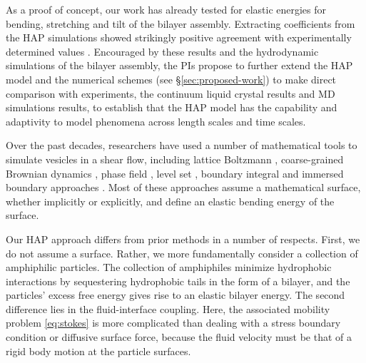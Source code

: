 As a proof of concept, our work has already tested for elastic energies for bending, stretching and tilt of the bilayer assembly.
Extracting coefficients from the HAP simulations showed strikingly
positive agreement with experimentally determined values
\cite{Fu2018_SIAM}.
Encouraged by these results and the hydrodynamic simulations of the bilayer assembly, the PIs propose to
further extend the HAP model and the numerical schemes (see \S\ref{sec:proposed-work})
to make direct comparison with experiments, the continuum liquid crystal results and MD simulations results, to establish that
the HAP model has the capability and adaptivity to model phenomena across length scales and time scales.

Over the past decades, researchers have used a number of mathematical tools 
to simulate vesicles in a shear flow, including  lattice Boltzmann \cite{KaouiHartingMisbah2011_PRE}, coarse-grained Brownian dynamics \cite{NoguchiTakasu2002_BJ},
phase field \cite{DuLiuWang2004_JCP,BibenKassnerMisbah2005_PRE}, 
level set \cite{DoyeuxGuyotChabannesEtAl2013_JCAM}, boundary integral \cite{Shravan09,Rahimian15} and 
immersed boundary approaches \cite{KimLai2010_JCP,KimLai2012_PRE,HuLaiSeolEtAl2016_JCP}. Most of these approaches
assume a mathematical surface, whether implicitly or explicitly, 
and define an elastic bending energy of the surface. 

Our HAP approach differs from prior methods in a number of respects. 
First, we do not assume a surface. Rather, we more fundamentally  consider a collection of amphiphilic particles.
The collection of amphiphiles minimize hydrophobic interactions by sequestering hydrophobic tails in the form of a bilayer, and the particles' excess free energy gives rise to an elastic bilayer energy. 
The second difference lies in the fluid-interface coupling. Here, the associated mobility problem \eqref{eq:stokes} 
is more complicated than dealing with a stress boundary condition or diffusive surface force, 
because the fluid velocity must be that of a rigid body motion at the particle surfaces.

